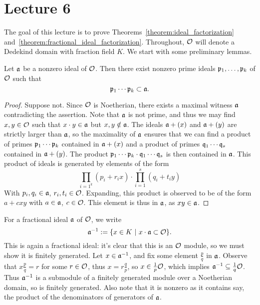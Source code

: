 \section{Lecture 6}

The goal of this lecture is to prove Theorems~\ref{theorem:ideal_factorization} and~\ref{theorem:fractional_ideal_factorization}.
Throughout, $\mathcal{O}$ will denote a Dedekind domain with fraction field $K$.
We start with some preliminary lemmas.

\begin{lemma}
  Let $\mathfrak{a}$ be a nonzero ideal of $\mathcal{O}$.
  Then there exist nonzero prime ideals $\mathfrak{p}_{1},\ldots,\mathfrak{p}_{k}$ of $\mathcal{O}$ such that
  \[ \mathfrak{p}_{1} \cdots \mathfrak{p}_{k} \subset \mathfrak{a}. \]
\end{lemma}
\begin{proof}
  Suppose not.
  Since $\mathcal{O}$ is Noetherian, there exists a maximal witness $\mathfrak{a}$ contradicting the assertion.
  Note that $\mathfrak{a}$ is not prime, and thus we may find $x,y \in \mathcal{O}$ such that $x \cdot y \in \mathfrak{a}$ but $x,y \notin \mathfrak{a}$.
  The ideals $\mathfrak{a} + (x)$ and $\mathfrak{a} + (y)$ are strictly larger than $\mathfrak{a}$, so the maximality of $\mathfrak{a}$ ensures that we can find a product of primes $\mathfrak{p}_{1} \cdots \mathfrak{p}_{k}$ contained in $\mathfrak{a} + (x)$ and a product of primes $\mathfrak{q}_{1} \cdots \mathfrak{q}_{s}$ contained in $\mathfrak{a} + (y)$.
  The product $\mathfrak{p}_{1} \cdots \mathfrak{p}_{k} \cdot \mathfrak{q}_{1} \cdots \mathfrak{q}_{s}$ is then contained in $\mathfrak{a}$.
  This product of ideals is generated by elements of the form
  \[\prod_{i=1^k}(p_i+r_ix)\cdot\prod_{i=1}^s(q_i+t_iy)\]
  With $p_i, q_i \in \mathfrak{a}$, $r_i, t_i \in \mathcal{O}$. 
  Expanding, this product is observed to be of the form $a+cxy$ with $a \in \mathfrak{a}$, $c \in \mathcal{O}$.
  This element is thus in $\mathfrak{a}$, as $xy \in \mathfrak{a}$.
\end{proof}

\begin{definition}
  For a fractional ideal $\mathfrak{a}$ of $\mathcal{O}$, we write
  \[ \mathfrak{a}^{-1} := \{x \in K \ | \ x \cdot \mathfrak{a} \subset \mathcal{O}\}. \]
  This is again a fractional ideal: it's clear that this is an $\mathcal{O}$ module, so we must show it is finitely generated.
  Let $x \in \mathfrak{a}^{-1}$, and fix some element $\frac pq$ in $\mathfrak{a}$.
  Observe that $x\frac pq=r$ for some $r\in \mathcal{O}$, thus $x=r\frac qp$, so $x \in \frac 1p \mathcal{O}$, which implies $\mathfrak{a}^{-1}\subseteq \frac 1q \mathcal{O}$.
  Thus $\mathfrak{a}^{-1}$ is a submodule of a finitely generated module over a Noetherian domain, so is finitely generated.
  Also note that it is nonzero as it contains say, the product of the denominators of generators of $\mathfrak{a}$. 
\end{definition}

